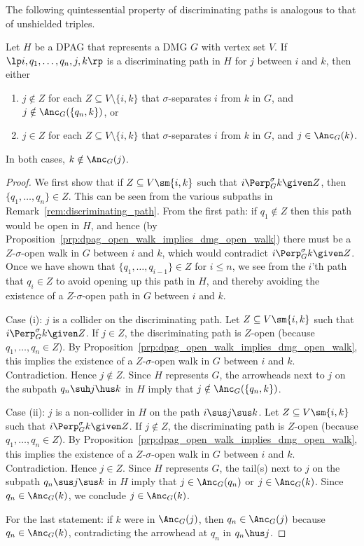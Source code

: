 The following quintessential property of discriminating paths is analogous to that of unshielded triples. 
\begin{Prp}\label{prp:orienting_discriminating_paths}
  Let $H$ be a DPAG that represents a DMG $G$ with vertex set $V$.
  If $\lt i, q_1, \dots, q_n, j, k \rt$ is a discriminating path in $H$ for $j$ between $i$ and $k$, then
  either 
  \begin{enumerate}[label=(\roman*)]
    \item $j \notin Z$ for each $Z \subseteq V \setminus \{i,k\}$ that $\sigma$-separates $i$ from $k$ in $G$, and $j \notin \Anc_G(\{q_n,k\})$, or
    \item $j \in Z$ for each $Z \subseteq V \setminus \{i,k\}$ that $\sigma$-separates $i$ from $k$ in $G$, and $j \in \Anc_G(k)$.
  \end{enumerate}
  In both cases, $k \notin \Anc_G(j)$.
\end{Prp}
\begin{proof}
  We first show that if $Z \subseteq V \sm \{i,k\}$ such that $i \Perp^\sigma_G k \given Z$, then $\{q_1, \dots, q_n\} \in Z$.
  This can be seen from the various subpaths in Remark~\ref{rem:discriminating_path}.
  From the first path: if $q_1 \notin Z$ then this path would be open in $H$, and hence (by Proposition~\ref{prp:dpag_open_walk_implies_dmg_open_walk}) there must be a $Z$-$\sigma$-open walk in $G$ between $i$ and $k$, which would contradict $i \Perp^\sigma_G k \given Z$.
  Once we have shown that $\{q_1, \dots, q_{i-1}\} \in Z$ for $i \le n$, we see from the $i$'th path that $q_i \in Z$ to avoid opening up this path in $H$, and thereby avoiding the existence of a $Z$-$\sigma$-open path in $G$ between $i$ and $k$.

  Case (i): $j$ is a collider on the discriminating path.
  Let $Z \subseteq V \sm \{i,k\}$ such that $i \Perp^\sigma_G k \given Z$. 
  If $j \in Z$, the discriminating path is $Z$-open (because $q_1,\dots,q_n \in Z$).
  By Proposition~\ref{prp:dpag_open_walk_implies_dmg_open_walk}, this implies the existence of a $Z$-$\sigma$-open walk in $G$ between $i$ and $k$.
  Contradiction. 
  Hence $j \notin Z$.
  Since $H$ represents $G$, the arrowheads next to $j$ on the subpath $q_n \suh j \hus k$ in $H$ imply that $j \notin \Anc_G(\{q_n,k\})$.

  Case (ii): $j$ is a non-collider in $H$ on the path $i \sus j \sus k$.
  Let $Z \subseteq V \sm \{i,k\}$ such that $i \Perp^\sigma_G k \given Z$. 
  If $j \notin Z$, the discriminating path is $Z$-open (because $q_1,\dots,q_n \in Z$).
  By Proposition~\ref{prp:dpag_open_walk_implies_dmg_open_walk}, this implies the existence of a $Z$-$\sigma$-open walk in $G$ between $i$ and $k$.
  Contradiction. 
  Hence $j \in Z$.
  Since $H$ represents $G$, the tail(s) next to $j$ on the subpath $q_n \sus j \sus k$ in $H$ imply that $j \in \Anc_G(q_n)$ or $j \in \Anc_G(k)$.
  Since $q_n \in \Anc_G(k)$, we conclude $j \in \Anc_G(k)$.

  For the last statement: if $k$ were in $\Anc_G(j)$, then $q_n \in \Anc_G(j)$ because $q_n \in \Anc_G(k)$, contradicting the arrowhead at $q_n$ in $q_n \hus j$.
\end{proof}
